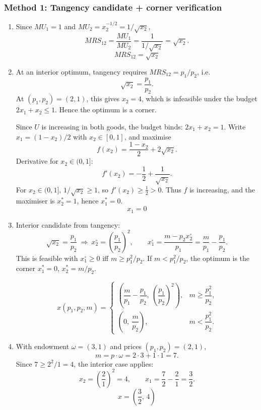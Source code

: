\documentclass[12pt]{article}
\newcommand{\dotp}{\cdot}
\begin{document}
\subsubsection*{Method 1: Tangency candidate + corner verification}
\begin{enumerate}[label=\arabic*., leftmargin=*]
\item Since \(MU_1=1\) and \(MU_2=x_2^{-1/2}=1/\sqrt{x_2}\),
\[
MRS_{12}=\frac{MU_1}{MU_2}=\frac{1}{1/\sqrt{x_2}}=\sqrt{x_2}.
\]
\[
\boxed{\,MRS_{12}=\sqrt{x_2}\,}
\]

\item At an interior optimum, tangency requires \(MRS_{12}=p_1/p_2\), i.e.
\[
\sqrt{x_2}=\frac{p_1}{p_2}.
\]
At \((p_1,p_2)=(2,1)\), this gives \(x_2=4\), which is infeasible under the budget \(2x_1+x_2\le 1\).
Hence the optimum is a corner.

Since \(U\) is increasing in both goods, the budget binds: \(2x_1+x_2=1\).
Write \(x_1=(1-x_2)/2\) with \(x_2\in[0,1]\), and maximise
\[
f(x_2)=\frac{1-x_2}{2}+2\sqrt{x_2}.
\]
Derivative for \(x_2\in(0,1]\):
\[
f'(x_2)=-\frac12+\frac{1}{\sqrt{x_2}}.
\]
For \(x_2\in(0,1]\), \(1/\sqrt{x_2}\ge 1\), so \(f'(x_2)\ge \tfrac12>0\). Thus \(f\) is increasing, and the maximiser is \(x_2^*=1\), hence \(x_1^*=0\).
\[
\boxed{\,x_1=0\,}
\]

\item Interior candidate from tangency:
\[
\sqrt{x_2}=\frac{p_1}{p_2}\ \Rightarrow\ x_2^\circ=\left(\frac{p_1}{p_2}\right)^2,
\qquad
x_1^\circ=\frac{m-p_2x_2^\circ}{p_1}
=\frac{m}{p_1}-\frac{p_1}{p_2}.
\]
This is feasible with \(x_1^\circ\ge 0\) iff \(m\ge p_1^2/p_2\).
If \(m<p_1^2/p_2\), the optimum is the corner \(x_1^*=0\), \(x_2^*=m/p_2\).

\[
\boxed{\,x(p_1,p_2,m)=
\begin{cases}
\left(\dfrac{m}{p_1}-\dfrac{p_1}{p_2},\ \left(\dfrac{p_1}{p_2}\right)^2\right), & m\ge \dfrac{p_1^2}{p_2},\\[1.0em]
\left(0,\ \dfrac{m}{p_2}\right), & m< \dfrac{p_1^2}{p_2}.
\end{cases}}
\]

\item With endowment \(\omega=(3,1)\) and prices \((p_1,p_2)=(2,1)\),
\[
m=p\dotp\omega=2\cdot 3+1\cdot 1=7.
\]
Since \(7\ge 2^2/1=4\), the interior case applies:
\[
x_2=\left(\frac{2}{1}\right)^2=4,\qquad
x_1=\frac{7}{2}-\frac{2}{1}=\frac{3}{2}.
\]
\[
\boxed{\,x=\left(\dfrac{3}{2},\,4\right)\,}
\]
\end{enumerate}
\end{document}
